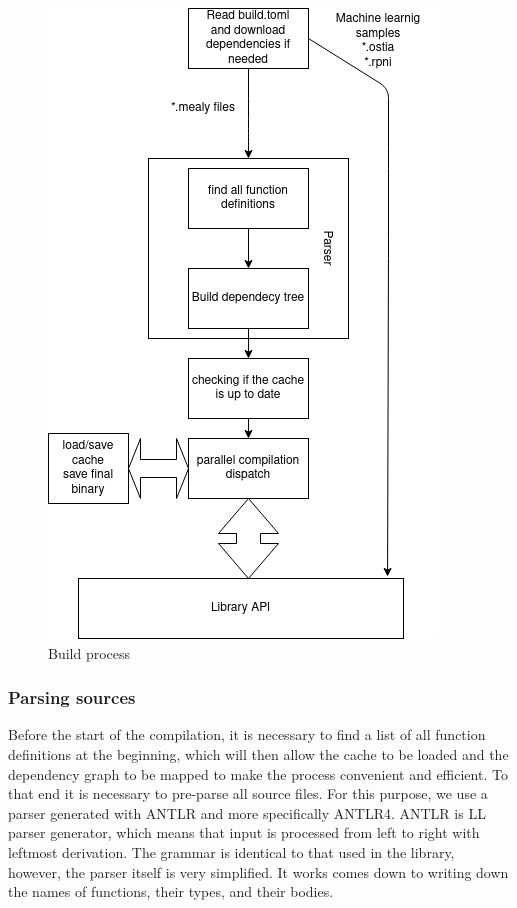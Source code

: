 \begin{figure}
\centering
\includegraphics[scale=0.53]{./diagram.png}
\caption{Build process}
\label{buildsystem:diagram}
\end{figure}

\hypertarget{parsing-sources}{%
\subsubsection{Parsing sources}\label{dependency-resolving}}

Before the start of the compilation, it is necessary to find a list of all
function definitions at the beginning, which will then allow the cache
to be loaded and the dependency graph to be mapped to make the process
convenient and efficient. To that end it is necessary to pre-parse all
source files. 
For this purpose, we use a parser generated with ANTLR and more specifically
ANTLR4. ANTLR is LL parser generator, which means that input is processed
from left to right with leftmost derivation. The grammar is identical to that used
in the library, however, the parser itself is very simplified. It works
comes down to writing down the names of functions, their types, and their bodies. 

